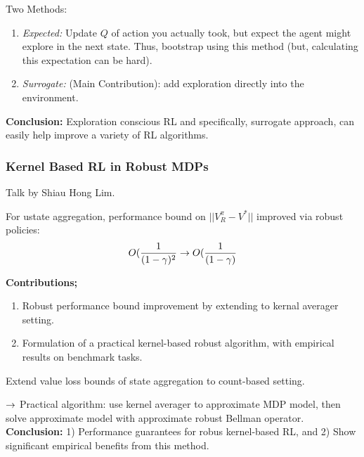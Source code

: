 Two Methods:
\begin{enumerate}
    \item {\it Expected:} Update $Q$ of action you actually took, but expect the agent might explore in the next state. Thus, bootstrap using this method (but, calculating this expectation can be hard).
    \item {\it Surrogate:} (Main Contribution): add exploration directly into the environment.
\end{enumerate}

{\bf Conclusion:} Exploration conscious RL and specifically, surrogate approach, can easily help improve a variety of RL algorithms.

\spacerule

\subsubsection{Kernel Based RL in Robust MDPs~\cite{lim2019kernel}}

Talk by Shiau Hong Lim. \\


For ustate aggregation, performance bound on $||V_R^\pi - V^*||$ improved via robust policies:
\[
O(\frac{1}{(1-\gamma)^2} \rightarrow O(\frac{1}{(1-\gamma)}
\]

{\bf Contributions;}
\begin{enumerate}
    \item Robust performance bound improvement by extending to kernal averager setting.
    \item Formulation of a practical kernel-based robust algorithm, with empirical results on benchmark tasks.
\end{enumerate}

\begin{theorem}
Extend value loss bounds of state aggregation to count-based setting.
\end{theorem}

$\rightarrow$ Practical algorithm: use kernel averager to approximate MDP model, then solve approximate model with approximate robust Bellman operator.\\

{\bf Conclusion:} 1) Performance guarantees for robus kernel-based RL, and 2) Show significant empirical benefits from this method.

